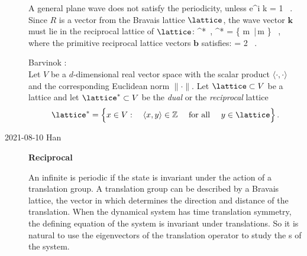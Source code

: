 \begin{description}
 A general plane wave does not
satisfy the periodicity, unless
\beq
e^{i {k} } = 1
\, .
Since ${R}$ is a vector from the Bravais lattice $\lattice$, the wave
vector $\mathbf{k}$ must lie in the reciprocal lattice of $\lattice$:
\beq
{} \in \lattice^*
\,,\quad
\lattice^* =
\left\{ m \,|\,m \in {}\right\} \, ,
where the primitive reciprocal lattice vectors $\mathbf{b}$ satisfies:
 \beq
{} \cdot {} = 2 \pi
\, .


Barvinok :
\\
Let $V$ be a $d$-dimensional real vector space with the scalar product
$\langle \cdot, \cdot \rangle$
and the corresponding Euclidean norm $\| \cdot\|$. Let $\lattice \subset V$ be a lattice
and let  $\lattice^{\ast} \subset V$ be the {\it dual} or the {\it reciprocal} lattice
\[
\lattice^{\ast}=\Bigl\{x \in V: \quad \langle x, y \rangle \in {\Bbb Z}
\quad
\mbox{ for all } \quad y \in \lattice \Bigr\}
\,.
\]

\item[2021-08-10 Han]
{\bf Reciprocal {\lattstate}}

An infinite {\lattstate} is periodic if the state is invariant under the action of a translation group.
A translation group can be described by a Bravais lattice, the vector in
which determines the direction and distance of the translation. When the dynamical system
has time translation symmetry, the defining equation of the system is invariant under translations.
So it is natural to use the eigenvectors of the translation operator to study the {\lattstate}s of the
system.


\end{description}
